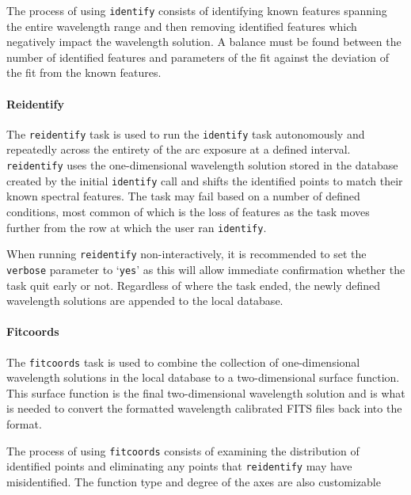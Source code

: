 The process of using \texttt{identify} consists of identifying known features spanning the entire wavelength range and then removing identified features which negatively impact the wavelength solution. A balance must be found between the number of identified features and parameters of the fit against the deviation of the fit from the known features. %

\paragraph{Reidentify}
The \texttt{reidentify} task is used to run the \texttt{identify} task autonomously and repeatedly across the entirety of the arc exposure at a defined interval. \texttt{reidentify} uses the one-dimensional wavelength solution stored in the database created by the initial \texttt{identify} call and shifts the identified points to match their known spectral features. The task may fail based on a number of defined conditions, most common of which is the loss of features as the task moves further from the row at which the user ran \texttt{identify}.
\prgph

When running \texttt{reidentify} non-interactively, it is recommended to set the \texttt{verbose} parameter to `\texttt{yes}' as this will allow immediate confirmation whether the task quit early or not. Regardless of where the task ended, the newly defined wavelength solutions are appended to the local database.

\paragraph{Fitcoords}
The \texttt{fitcoords} task is used to combine the collection of one-dimensional wavelength solutions in the local database to a two-dimensional surface function. This surface function is the final two-dimensional wavelength solution and is what is needed to convert the \iraf formatted wavelength calibrated \gls{FITS} files back into the \polsalt format.
\prgph

The process of using \texttt{fitcoords} consists of examining the distribution of identified points and eliminating any points that \texttt{reidentify} may have misidentified. The function type and degree of the axes are also customizable


